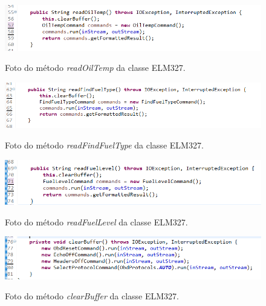 \begin{figure}[!ht]
\centering
\caption{Foto do método \textit{readOilTemp} da classe ELM327.} 
{\includegraphics[scale=.85]{imagens/pacoteScanner-ELM327_readOilTemp.PNG}}\\
 \label{Fig:elm327_read_oil_temp}
\end{figure}

\begin{figure}[!ht]
\centering
\caption{Foto do método \textit{readFindFuelType} da classe ELM327.} 
{\includegraphics[scale=.80]{imagens/pacoteScanner-ELM327_readFindFuelType.PNG}}\\
 \label{Fig:elm327_read_find_fuel_type}
\end{figure}

\begin{figure}[!ht]
\centering
\caption{Foto do método \textit{readFuelLevel} da classe ELM327.} 
{\includegraphics[scale=.70]{imagens/pacoteScanner-ELM327_readFuelLevel.PNG}}\\
 \label{Fig:elm327_read_fuel_level}
\end{figure}

\begin{figure}[!ht]
\centering
\caption{Foto do método \textit{clearBuffer} da classe ELM327.} 
{\includegraphics[scale=.70]{imagens/pacoteScanner-ELM327_clearBuffer.PNG}}\\
 \label{Fig:elm327_clear_buffer}
\end{figure}

